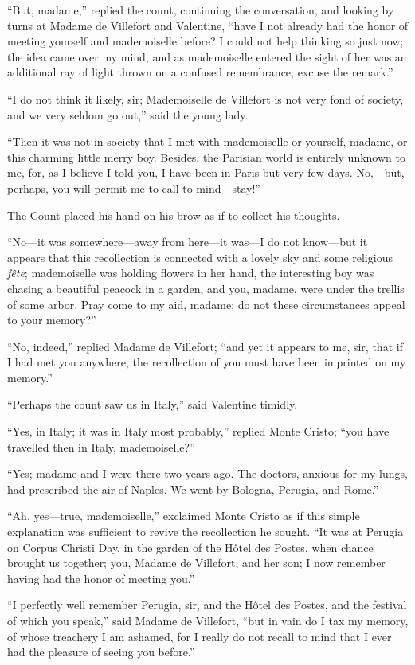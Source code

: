 “But, madame,” replied the count, continuing the conversation, and
looking by turns at Madame de Villefort and Valentine, “have I not
already had the honor of meeting yourself and mademoiselle before? I
could not help thinking so just now; the idea came over my mind, and as
mademoiselle entered the sight of her was an additional ray of light
thrown on a confused remembrance; excuse the remark.”

“I do not think it likely, sir; Mademoiselle de Villefort is not very
fond of society, and we very seldom go out,” said the young lady.

“Then it was not in society that I met with mademoiselle or yourself,
madame, or this charming little merry boy. Besides, the Parisian world
is entirely unknown to me, for, as I believe I told you, I have been in
Paris but very few days. No,—but, perhaps, you will permit me to call
to mind—stay!”

The Count placed his hand on his brow as if to collect his thoughts.

“No—it was somewhere—away from here—it was—I do not know—but it appears
that this recollection is connected with a lovely sky and some
religious \textit{fête}; mademoiselle was holding flowers in her hand, the
interesting boy was chasing a beautiful peacock in a garden, and you,
madame, were under the trellis of some arbor. Pray come to my aid,
madame; do not these circumstances appeal to your memory?”

“No, indeed,” replied Madame de Villefort; “and yet it appears to me,
sir, that if I had met you anywhere, the recollection of you must have
been imprinted on my memory.”

“Perhaps the count saw us in Italy,” said Valentine timidly.

“Yes, in Italy; it was in Italy most probably,” replied Monte Cristo;
“you have travelled then in Italy, mademoiselle?”

“Yes; madame and I were there two years ago. The doctors, anxious for
my lungs, had prescribed the air of Naples. We went by Bologna,
Perugia, and Rome.”

“Ah, yes—true, mademoiselle,” exclaimed Monte Cristo as if this simple
explanation was sufficient to revive the recollection he sought. “It
was at Perugia on Corpus Christi Day, in the garden of the Hôtel des
Postes, when chance brought us together; you, Madame de Villefort, and
her son; I now remember having had the honor of meeting you.”

“I perfectly well remember Perugia, sir, and the Hôtel des Postes, and
the festival of which you speak,” said Madame de Villefort, “but in
vain do I tax my memory, of whose treachery I am ashamed, for I really
do not recall to mind that I ever had the pleasure of seeing you
before.”

